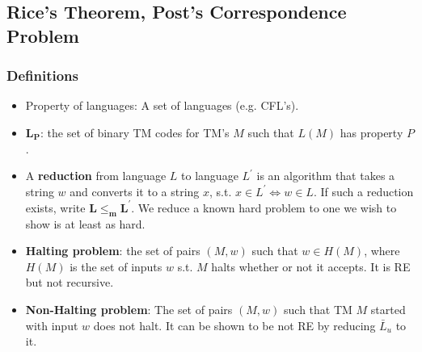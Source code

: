 \subsection{\color{ForestGreen}Rice's Theorem, Post's Correspondence Problem}
\subsubsection{Definitions}
\begin{itemize}
    \item Property of languages: A set of languages (e.g. CFL's).
    \item $\mathbf{L_P}$: the set of binary TM codes for TM’s $M$ such that $L(M)$ has property $P$.
    \item A \textbf{reduction} from language $L$ to language $L^\prime$ is an algorithm that takes a string $w$ and converts it to a string $x$, s.t. $x\in L^\prime \iff w \in L$. If such a reduction exists, write $\mathbf{L \leq_m L^\prime}$. We reduce a known hard problem to one we wish to show is at least as hard. 
    \item \textbf{Halting problem}: the set of pairs $(M,w)$ such that $w\in H(M)$, where $H(M)$ is the set of inputs $w$ s.t. $M$ halts whether or not it accepts. It is RE but not recursive.
    \item \textbf{Non-Halting problem}: The set of pairs $(M, w)$ such that TM $M$ started with input $w$ does not halt. It can be shown to be not RE by reducing $\bar L_u$ to it. 
\end{itemize}
